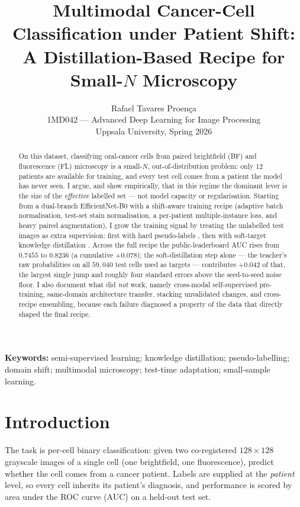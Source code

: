 \documentclass[11pt]{article}
\title{\textbf{Multimodal Cancer-Cell Classification under Patient Shift:\\
A Distillation-Based Recipe for Small-$N$ Microscopy}}
\author{Rafael Tavares Proen\c{c}a\\[2pt]
{\small 1MD042 --- Advanced Deep Learning for Image Processing}\\
{\small Uppsala University, Spring 2026}}
\date{}
\begin{document}
\maketitle

\begin{abstract}
\noindent
On this dataset, classifying oral-cancer cells from paired brightfield (BF) and fluorescence (FL)
microscopy is a small-$N$, out-of-distribution problem: only 12 patients are available for training,
and every test cell comes from a patient the model has never seen. I argue, and show empirically,
that in this regime the dominant lever is the size of the \emph{effective} labelled set --- not model
capacity or regularisation. Starting from a dual-branch EfficientNet-B0 with a shift-aware training
recipe (adaptive batch normalisation, test-set stain normalisation, a per-patient multiple-instance
loss, and heavy paired augmentation), I grow the training signal by treating the unlabelled test
images as extra supervision: first with hard pseudo-labels \citep{lee2013}, then with soft-target
knowledge distillation \citep{hinton2015}. Across the full recipe the public-leaderboard AUC rises from
$0.7455$ to $0.8236$ (a cumulative $+0.078$); the soft-distillation step alone --- the teacher's raw
probabilities on all $59{,}040$ test cells used as targets --- contributes $+0.042$ of that, the largest
single jump and roughly four standard errors above the seed-to-seed noise floor. I also document what
did \emph{not} work, namely cross-modal self-supervised pre-training,
same-domain architecture transfer, stacking unvalidated changes, and cross-recipe ensembling,
because each failure diagnosed a property of the data that directly shaped the final recipe.
\end{abstract}

\noindent\textbf{Keywords:} semi-supervised learning; knowledge distillation; pseudo-labelling; domain
shift; multimodal microscopy; test-time adaptation; small-sample learning.

\section{Introduction}

The task is per-cell binary classification: given two co-registered $128\times128$ grayscale images of a
single cell (one brightfield, one fluorescence), predict whether the cell comes from a cancer patient.
Labels are supplied at the \emph{patient} level, so every cell inherits its patient's diagnosis,
and performance is scored by area under the ROC curve (AUC) on a held-out test set.
\end{document}
